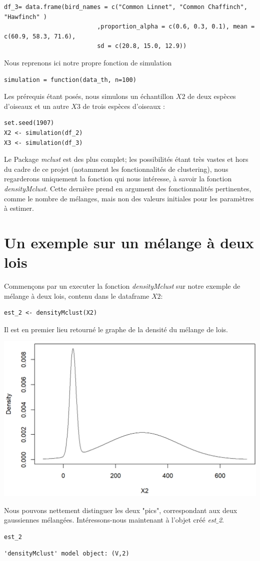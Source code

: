 \documentclass[frenchb]{report}
\newcommand{\1}{\mathbbm{1}}
\theoremstyle{definition}\newtheorem{defn}{Définition}
\theoremstyle{definition}\newtheorem{exm}{Exemple}
\theoremstyle{definition}\newtheorem{nota}{Notation}
\theoremstyle{definition}\newtheorem{rem}{Remarque}
\begin{document}
\begin{appendices}
\begin{lstlisting}
df_3= data.frame(bird_names = c("Common Linnet", "Common Chaffinch", "Hawfinch" )
                          ,proportion_alpha = c(0.6, 0.3, 0.1), mean = c(60.9, 58.3, 71.6),
                          sd = c(20.8, 15.0, 12.9))
\end{lstlisting}
%
Nous reprenons ici notre propre fonction de simulation
\begin{lstlisting}
simulation = function(data_th, n=100)
\end{lstlisting}
%
Les prérequis étant posés, nous simulons un échantillon $X2$ de deux espèces d'oiseaux et un autre $X3$ de trois espèces d'oiseaux :
\begin{lstlisting}
set.seed(1907)
X2 <- simulation(df_2)
X3 <- simulation(df_3)
\end{lstlisting}
%
Le Package \textit{mclust} est des plus complet; les possibilités étant très vastes et hors du cadre de ce projet (notamment les fonctionnalités de clustering), nous regarderons uniquement la fonction qui nous intéresse, à savoir la fonction \textit{densityMclust}. \newline
Cette dernière prend en argument des fonctionnalités pertinentes, comme le nombre de mélanges, mais non des valeurs initiales pour les paramètres à estimer.
%

\section{Un exemple sur un mélange à deux lois}
Commençons par un executer la fonction \textit{densityMclust} sur notre exemple de mélange à deux lois, contenu dans le dataframe $X2$:
\begin{lstlisting}
est_2 <- densityMclust(X2)
\end{lstlisting}
%
Il est en premier lieu retourné le graphe de la densité du mélange de lois.
\begin{center}\includegraphics[scale=0.75]{fig1.png}\end{center}
Nous pouvons nettement distinguer les deux "pics", correspondant aux deux gaussiennes mélangées.
Intéressons-nous maintenant à l'objet créé \textit{est$\_$2}.
\begin{lstlisting}
est_2
\end{lstlisting}
\begin{verbatim}
'densityMclust' model object: (V,2) 


\end{verbatim}
\end{appendices}
\end{document}
